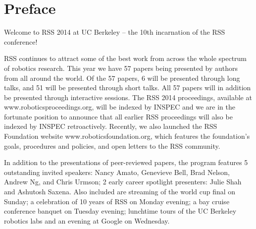 
\chapter*{Preface}


                                                                     
                                             
\vspace{1cm}
\begingroup{}
\Large

Welcome to RSS 2014 at UC Berkeley – the 10th incarnation of the RSS conference! 

\vspace{1mm}

RSS continues to attract some of the best work from across the whole spectrum of robotics research. This year we have 57 papers being presented by authors from all around the world. Of the 57 papers, 6 will be presented through long talks, and 51 will be presented through short talks.  All 57 papers will in addition be presented through interactive sessions. The RSS 2014 proceedings, available at www.roboticsproceedings.org, will be indexed by INSPEC and we are in the fortunate position to announce that all earlier RSS proceedings will also be indexed by INSPEC retroactively. Recently, we also launched the RSS Foundation website www.roboticsfoundation.org, which features the foundation’s goals, procedures and policies, and open letters to the RSS community.

\vspace{1mm}

In addition to the presentations of peer-reviewed papers, the program features 5 outstanding invited speakers: Nancy Amato, Genevieve Bell, Brad Nelson, Andrew Ng, and Chris Urmson; 2 early career spotlight presenters: Julie Shah and Ashutosh Saxena. Also included are streaming of the world cup final on Sunday; a celebration of 10 years of RSS on Monday evening; a bay cruise conference banquet on Tuesday evening; lunchtime tours of the UC Berkeley robotics labs and an evening at Google on Wednesday.

\vspace{1mm}

